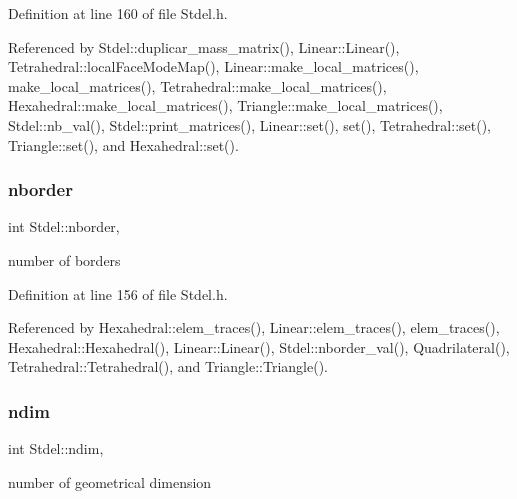 Definition at line 160 of file Stdel.\+h.



Referenced by Stdel\+::duplicar\+\_\+mass\+\_\+matrix(), Linear\+::\+Linear(), Tetrahedral\+::local\+Face\+Mode\+Map(), Linear\+::make\+\_\+local\+\_\+matrices(), make\+\_\+local\+\_\+matrices(), Tetrahedral\+::make\+\_\+local\+\_\+matrices(), Hexahedral\+::make\+\_\+local\+\_\+matrices(), Triangle\+::make\+\_\+local\+\_\+matrices(), Stdel\+::nb\+\_\+val(), Stdel\+::print\+\_\+matrices(), Linear\+::set(), set(), Tetrahedral\+::set(), Triangle\+::set(), and Hexahedral\+::set().

\mbox{\label{classStdel_ad0f111a2ba3d9415618c8408da3fc100}} 
\subsubsection{\texorpdfstring{nborder}{nborder}}
{\footnotesize\ttfamily int Stdel\+::nborder\hspace{0.3cm}{\ttfamily [protected]}, {\ttfamily [inherited]}}



number of borders 



Definition at line 156 of file Stdel.\+h.



Referenced by Hexahedral\+::elem\+\_\+traces(), Linear\+::elem\+\_\+traces(), elem\+\_\+traces(), Hexahedral\+::\+Hexahedral(), Linear\+::\+Linear(), Stdel\+::nborder\+\_\+val(), Quadrilateral(), Tetrahedral\+::\+Tetrahedral(), and Triangle\+::\+Triangle().

\mbox{\label{classStdel_a912f36b591d847eed2531a3b3a51a520}} 
\subsubsection{\texorpdfstring{ndim}{ndim}}
{\footnotesize\ttfamily int Stdel\+::ndim\hspace{0.3cm}{\ttfamily [protected]}, {\ttfamily [inherited]}}



number of geometrical dimension 



